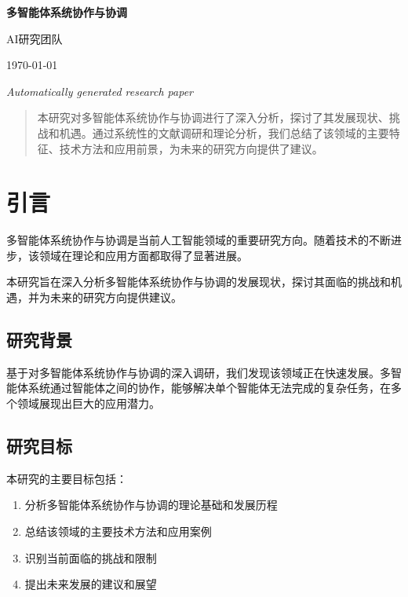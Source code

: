 \documentclass[12pt]{article}
\begin{document}
\begin{titlepage}
    \centering
    \vspace*{2cm}
    {\Huge\bfseries 多智能体系统协作与协调\par}
    \vspace{1.5cm}
    {\large AI研究团队\par}
    \vspace{0.5cm}
    {\large \today\par}
    \vfill
    {\large \textit{Automatically generated research paper}\par}
\end{titlepage}

\begin{abstract}
本研究对多智能体系统协作与协调进行了深入分析，探讨了其发展现状、挑战和机遇。通过系统性的文献调研和理论分析，我们总结了该领域的主要特征、技术方法和应用前景，为未来的研究方向提供了建议。
\end{abstract}

\tableofcontents
\newpage

\section{引言}
多智能体系统协作与协调是当前人工智能领域的重要研究方向。随着技术的不断进步，该领域在理论和应用方面都取得了显著进展。

本研究旨在深入分析多智能体系统协作与协调的发展现状，探讨其面临的挑战和机遇，并为未来的研究方向提供建议。

\subsection{研究背景}
基于对多智能体系统协作与协调的深入调研，我们发现该领域正在快速发展。多智能体系统通过智能体之间的协作，能够解决单个智能体无法完成的复杂任务，在多个领域展现出巨大的应用潜力。

\subsection{研究目标}
本研究的主要目标包括：
\begin{enumerate}
    \item 分析多智能体系统协作与协调的理论基础和发展历程
    \item 总结该领域的主要技术方法和应用案例
    \item 识别当前面临的挑战和限制
    \item 提出未来发展的建议和展望
\end{enumerate}
\end{document}
